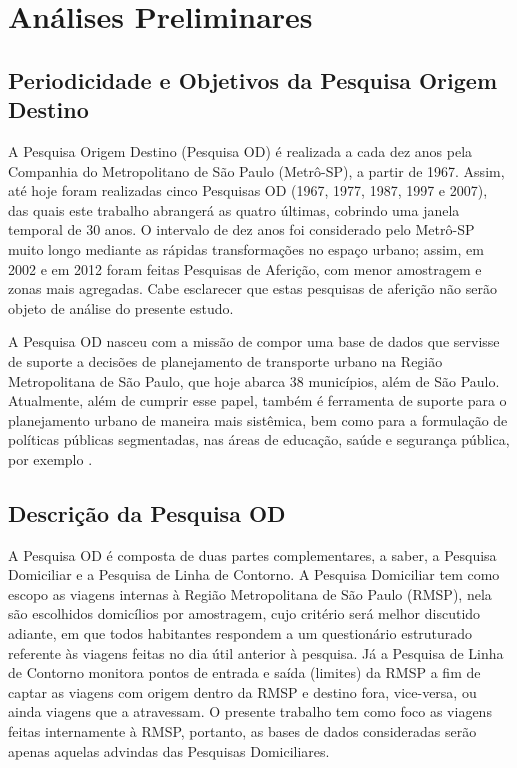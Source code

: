 \chapter{Análises Preliminares}\label{chap:analises-preliminares}

\section{Periodicidade e Objetivos da Pesquisa Origem Destino}\label{sec:period-obj}

A Pesquisa Origem Destino (Pesquisa OD) é realizada a cada dez anos pela Companhia do Metropolitano de São Paulo (Metrô-SP), a partir de 1967. Assim, até hoje foram realizadas cinco Pesquisas OD (1967, 1977, 1987, 1997 e 2007), das quais este trabalho abrangerá as quatro últimas, cobrindo uma janela temporal de 30 anos. O intervalo de dez anos foi considerado pelo Metrô-SP muito longo mediante as rápidas transformações no espaço urbano; assim, em 2002 e em 2012 foram feitas Pesquisas de Aferição, com menor amostragem e zonas mais agregadas. Cabe esclarecer que estas pesquisas de aferição não serão objeto de análise do presente estudo.

A Pesquisa OD nasceu com a missão de compor uma base de dados que servisse de suporte a decisões de planejamento de transporte urbano na Região Metropolitana de São Paulo, que hoje abarca 38 municípios, além de São Paulo. Atualmente, além de cumprir esse papel, também é ferramenta de suporte para o planejamento urbano de maneira mais sistêmica, bem como para a formulação de políticas públicas segmentadas, nas áreas de educação, saúde e segurança pública, por exemplo \cite{MANUALOD2007}.

\section{Descrição da Pesquisa OD}\label{sec:descricao-OD}

A Pesquisa OD é composta de duas partes complementares, a saber, a Pesquisa Domiciliar e a Pesquisa de Linha de Contorno. A Pesquisa Domiciliar tem como escopo as viagens internas à Região Metropolitana de São Paulo (RMSP), nela são escolhidos domicílios por amostragem, cujo critério será melhor discutido adiante, em que todos habitantes respondem a um questionário estruturado referente às viagens feitas no dia útil anterior à pesquisa. Já a Pesquisa de Linha de Contorno monitora pontos de entrada e saída (limites) da RMSP a fim de captar as viagens com origem dentro da RMSP e destino fora, vice-versa, ou ainda viagens que a atravessam. O presente trabalho tem como foco as viagens feitas internamente à RMSP, portanto, as bases de dados consideradas serão apenas aquelas advindas das Pesquisas Domiciliares.

